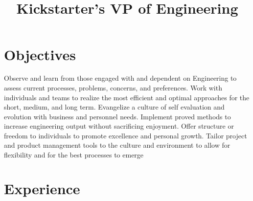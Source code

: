 \documentclass[11pt,letterpaper,roman]{moderncv}
\title{Kickstarter's VP of Engineering}
\begin{document}
\makecvtitle

\renewcommand{\thefootnote}{\fnsymbol{footnote}}

\section{Objectives}
Observe and learn from those engaged with and dependent on Engineering to assess current processes, problems, concerns, and preferences. Work with individuals and teams to realize the most efficient and optimal approaches for the short, medium, and long term. Evangelize a culture of self evaluation and evolution with business and personnel needs. Implement proved methods to increase engineering output without sacrificing enjoyment. Offer structure or freedom to individuals to promote excellence and personal growth. Tailor project and product management tools to the culture and environment to allow for flexibility and for the best processes to emerge

\section{Experience}
\end{document}

